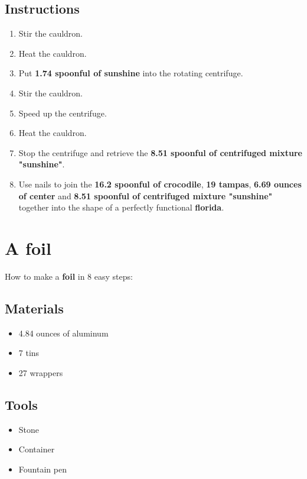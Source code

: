 \documentclass{article}
\begin{document}
\subsection{Instructions}\begin{enumerate}
\item 
Stir the cauldron.
\item 
Heat the cauldron.
\item 
Put \textbf{1.74 spoonful of sunshine} into the rotating centrifuge.
\item 
Stir the cauldron.
\item 
Speed up the centrifuge.
\item 
Heat the cauldron.
\item 
Stop the centrifuge and retrieve the \textbf{8.51 spoonful of centrifuged mixture "sunshine"}.
\item 
Use nails to join the \textbf{16.2 spoonful of crocodile}, \textbf{19 tampas}, \textbf{6.69 ounces of center} and \textbf{8.51 spoonful of centrifuged mixture "sunshine"} together into the shape of a perfectly functional \textbf{florida}.
\end{enumerate}
\newpage
\section{A foil}How to make a \textbf{foil} in 8 easy steps:

\subsection{Materials}\begin{itemize}
\item 
4.84 ounces of aluminum
\item 
7 tins
\item 
27 wrappers
\end{itemize}
\subsection{Tools}\begin{itemize}
\item 
Stone
\item 
Container
\item 
Fountain pen
\end{itemize}
\end{document}
